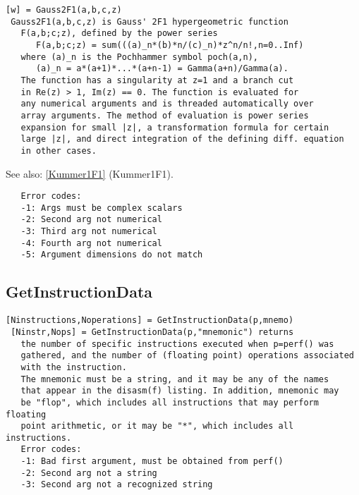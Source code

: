 \documentclass[a4paper]{article}
\begin{document}
\begin{tscreen}
\begin{verbatim}
[w] = Gauss2F1(a,b,c,z)
 Gauss2F1(a,b,c,z) is Gauss' 2F1 hypergeometric function
   F(a,b;c;z), defined by the power series
      F(a,b;c;z) = sum(((a)_n*(b)*n/(c)_n)*z^n/n!,n=0..Inf)
   where (a)_n is the Pochhammer symbol poch(a,n),
      (a)_n = a*(a+1)*...*(a+n-1) = Gamma(a+n)/Gamma(a).
   The function has a singularity at z=1 and a branch cut
   in Re(z) > 1, Im(z) == 0. The function is evaluated for
   any numerical arguments and is threaded automatically over
   array arguments. The method of evaluation is power series
   expansion for small |z|, a transformation formula for certain
   large |z|, and direct integration of the defining diff. equation
   in other cases.
\end{verbatim}

See also: \ref{Kummer1F1} {(Kummer1F1)}.
\begin{verbatim}
   Error codes:
   -1: Args must be complex scalars
   -2: Second arg not numerical
   -3: Third arg not numerical
   -4: Fourth arg not numerical
   -5: Argument dimensions do not match
\end{verbatim}
\end{tscreen}





\subsection{GetInstructionData\label{GetInstructionData}}

\begin{tscreen}
\begin{verbatim}
[Ninstructions,Noperations] = GetInstructionData(p,mnemo)
 [Ninstr,Nops] = GetInstructionData(p,"mnemonic") returns
   the number of specific instructions executed when p=perf() was
   gathered, and the number of (floating point) operations associated
   with the instruction.
   The mnemonic must be a string, and it may be any of the names
   that appear in the disasm(f) listing. In addition, mnemonic may
   be "flop", which includes all instructions that may perform floating
   point arithmetic, or it may be "*", which includes all instructions.
   Error codes:
   -1: Bad first argument, must be obtained from perf()
   -2: Second arg not a string
   -3: Second arg not a recognized string
   
\end{verbatim}
\end{tscreen}
\end{document}
